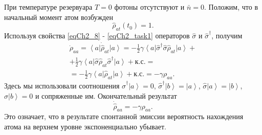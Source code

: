 При температуре резервуара  $T = 0$  фотоны отсутствуют и $\bar{n} =
0$.  Положим, что в начальный момент атом возбужден 
\[
\hat{\rho}_{at}\left(t_0\right) = 1.
\]
Используя свойства \eqref{eqCh2_8} - \eqref{eqCh2_task1} операторов 
$\hat{\sigma}$ и $\hat{\sigma}^{\dag}$, получим   
\begin{eqnarray}
\dot{\rho}_{aa} = \left<a\right|\dot{\hat{\rho}}_{at}\left|a\right> =
-\frac{1}{2}\gamma
\left<a\right|\hat{\sigma}^{\dag}\hat{\sigma}\hat{\rho}_{at}\left|a\right>
+ 
\nonumber \\
+ \frac{1}{2}\gamma
\left<a\right|\hat{\sigma}\hat{\rho}_{at}\hat{\sigma}^{\dag}\left|a\right>
+ \mbox{к.с.} = 
\nonumber \\
= 
- \frac{1}{2}\gamma
\left<a\right|\hat{\rho}_{at}\left|a\right> + \mbox{к.с.} = 
- \gamma \rho_{aa}.
\label{eqCh2_101}
\end{eqnarray}
Здесь мы использовали соотношения
\(\hat{\sigma}^{\dag}\left|a\right> = 0\),
\(\hat{\sigma}^{\dag}\left|b\right> = \left|a\right>\),
\(\hat{\sigma}\left|a\right> = \left|b\right>\),
\(\hat{\sigma}\left|b\right> = 0\)
и сопряженные им. Окончательный результат 
\begin{equation}
\dot{\hat{\rho}}_{aa} = - \gamma \rho_{aa}.
\label{eqCh2_102}
\end{equation}
Это означает, что в результате спонтанной эмиссии вероятность
нахождения атома на верхнем уровне экспоненциально убывает. 
